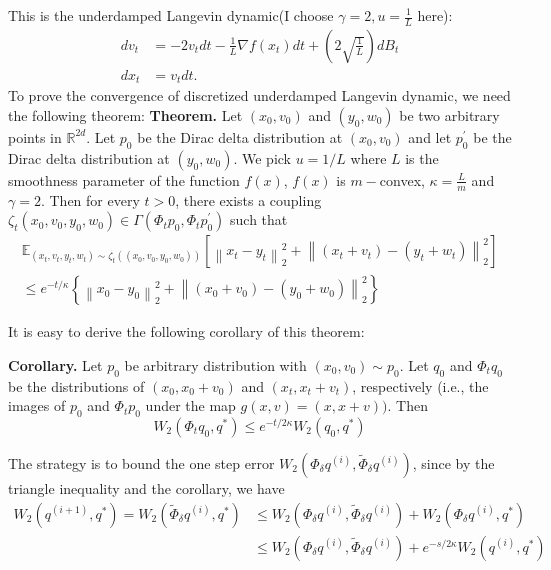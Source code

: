 \documentclass[12pt,a4paper]{article}
\begin{document}
	This is the underdamped Langevin dynamic(I choose $\gamma = 2, u= \frac{1}{L}$ here):
	\begin{equation}
	\begin{aligned}
		d {v}_{t} &=-2{v}_{t} d t-\frac{1}{L} \nabla f\left({x}_{t}\right) d t+(2\sqrt{ \frac{1}{L}}) d B_{t} \\
		d {x}_{t} &={v}_{t} d t.
	\end{aligned}
	\end{equation}
	To prove the convergence of discretized underdamped Langevin dynamic, we need the following theorem:
		\newline
	\textbf{Theorem.} Let $\left(x_{0}, v_{0}\right)$ and $\left(y_{0}, w_{0}\right)$ be two arbitrary points in $\mathbb{R}^{2 d}$. Let $p_{0}$ be the Dirac delta distribution at $\left(x_{0}, v_{0}\right)$ and let $p_{0}^{\prime}$ be the Dirac delta distribution at $\left(y_{0}, w_{0}\right) .$ We pick $u=1 / L$ where $L$ is the smoothness parameter of the function $f(x)$, $f(x)$ is $m-$convex, $\kappa = \frac{L}{m}$  and $\gamma=2 .$ Then for every $t>0$, there exists a coupling $\zeta_{t}\left(x_{0}, v_{0}, y_{0}, w_{0}\right) \in \Gamma\left(\Phi_{t} p_{0}, \Phi_{t} p_{0}^{\prime}\right)$ such that
	$$
	\begin{array}{r}
		\mathbb{E}_{\left(x_{t}, v_{t}, y_{t}, w_{t}\right) \sim \zeta_{t}\left(\left(x_{0}, v_{0}, y_{0}, w_{0}\right)\right)}\left[\left\|x_{t}-y_{t}\right\|_{2}^{2}+\left\|\left(x_{t}+v_{t}\right)-\left(y_{t}+w_{t}\right)\right\|_{2}^{2}\right] \\
		\leq e^{-t / \kappa}\left\{\left\|x_{0}-y_{0}\right\|_{2}^{2}+\left\|\left(x_{0}+v_{0}\right)-\left(y_{0}+w_{0}\right)\right\|_{2}^{2}\right\}
	\end{array}
	$$ 
	
	It is easy to derive the following corollary of this theorem:
	\newline
	
	\textbf{Corollary.} Let $p_{0}$ be arbitrary distribution with $\left(x_{0}, v_{0}\right) \sim p_{0} .$ Let $q_{0}$ and $\Phi_{t} q_{0}$ be the distributions of $\left(x_{0}, x_{0}+v_{0}\right)$ and $\left(x_{t}, x_{t}+v_{t}\right)$, respectively (i.e., the images of $p_{0}$ and $\Phi_{t} p_{0}$ under the map $g(x, v)=(x, x+v))$. Then
	$$
	W_{2}\left(\Phi_{t} q_{0}, q^{*}\right) \leq e^{-t / 2 \kappa} W_{2}\left(q_{0}, q^{*}\right)
	$$ 
	
	The strategy is to bound the one step error $W_{2}\left(\Phi_{\delta} q^{(i)}, \tilde{\Phi}_{\delta} q^{(i)}\right)$, since by the triangle inequality and the corollary, we have 
	\begin{equation}
		\begin{aligned}
		W_{2}\left(q^{(i+1)}, q^{*}\right)=W_{2}\left(\tilde{\Phi}_{\delta} q^{(i)}, q^{*}\right) &\leq W_{2}\left(\Phi_{\delta} q^{(i)}, \tilde{\Phi}_{\delta} q^{(i)}\right)+W_{2}\left(\Phi_{\delta} q^{(i)}, q^{*}\right)\\
		&\leq W_{2}\left(\Phi_{\delta} q^{(i)}, \tilde{\Phi}_{\delta} q^{(i)}\right)+e^{-s / 2 \kappa} W_{2}\left(q^{(i)}, q^{*}\right)
		\end{aligned}
	\end{equation}
\end{document}
